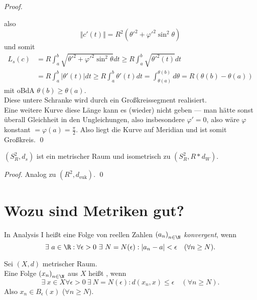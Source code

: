 \begin{lemma}
\begin{proof}
\begin{small}
    \end{small}
    also
    \begin{equation*}
      \Vert c'(t) \Vert = R^2({\theta'}^2 + {\varphi'}^2\sin^2\theta)
    \end{equation*}
    und somit
    \begin{align*}
      L_s(c) &= R\int_a^b\sqrt{{\theta'}^2+{\varphi'}^2\sin^2\theta}dt \geq R\int_a^b\sqrt{{\theta'}^2(t)}dt \\
      &= R\int_a^b \vert \theta'(t) \vert dt \geq R\int_a^b \theta'(t)dt = \int_{\theta(a)}^{\theta(b)}d\theta = R(\theta(b)-\theta(a))
    \end{align*}
    mit oBdA \( \theta(b) \geq \theta(a) \). \\
    Diese untere Schranke wird durch ein Großkreissegment realisiert. \\
    Eine weitere Kurve diese Länge kann es (wieder) nicht geben --- man hätte sonst überall Gleichheit in den Ungleichungen, also insbesondere \( \varphi' = 0 \), also wäre \( \varphi \) konstant \( = \varphi(a) = \frac{\pi}{2} \). Also liegt die Kurve auf Meridian und ist somit Großkreis. \qed{}
  \end{proof}
\end{lemma}

\begin{theorem}
  \( (S^2_R, d_s) \) ist ein metrischer Raum und isometrisch zu \( (S^2_R, R*d_W) \).
  \begin{proof}
    Analog zu \( (R^2, d_\text{euk}) \). \qed{}
  \end{proof}
\end{theorem}

\section{Wozu sind Metriken gut?}

\begin{remark}
  In Analysis I heißt eine Folge von reellen Zahlen \( {(a_n)}_{n \in \N} \) \emph{konvergent}, wenn
  \begin{equation*}
    \exists \ a \in \R : \forall \epsilon > 0 \ \exists \ N = N(\epsilon) : \vert a_n - a \vert < \epsilon \quad (\forall n \geq N)\text{.}
  \end{equation*}
\end{remark}

\begin{remark}
  Sei \( (X, d) \) metrischer Raum. \\
  Eine Folge \( {(x_n)}_{n \in \N} \) aus \( X \) heißt , wenn
  \begin{equation*}
    \exists \ x \in X \forall \epsilon > 0 \ \exists \ N = N(\epsilon) : d(x_n, x) \leq \epsilon \quad (\forall n \geq N)\text{.}
  \end{equation*}
  Also \( x_n \in B_\epsilon(x) \) (\( \forall n \geq N \)).
\end{remark}

